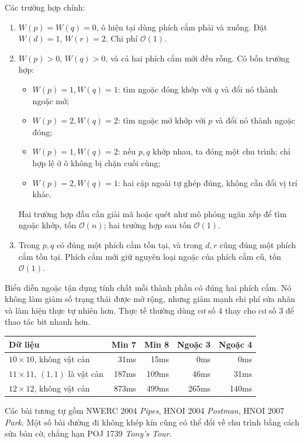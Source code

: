 \documentclass[11pt]{article}
\newcommand{\Oh}{\mathcal{O}}
\begin{document}
Các trường hợp chính:
\begin{enumerate}
  \item {} \(W(p)=W(q)=0\), ô hiện tại dùng phích cắm
  phải và xuống. Đặt \(W(d)=1\), \(W(r)=2\). Chi phí \(\Oh(1)\).
  \item {} \(W(p)>0\), \(W(q)>0\), và cả hai phích
  cắm mới đều rỗng. Có bốn trường hợp:
  \begin{itemize}
    \item \(W(p)=1,W(q)=1\): tìm ngoặc đóng khớp với \(q\) và đổi nó thành
    ngoặc mở;
    \item \(W(p)=2,W(q)=2\): tìm ngoặc mở khớp với \(p\) và đổi nó thành
    ngoặc đóng;
    \item \(W(p)=1,W(q)=2\): nếu \(p,q\) khớp nhau, ta đóng một chu trình; chỉ
    hợp lệ ở ô không bị chặn cuối cùng;
    \item \(W(p)=2,W(q)=1\): hai cặp ngoài tự ghép đúng, không cần đổi vị trí
    khác.
  \end{itemize}
  Hai trường hợp đầu cần giải mã hoặc quét như mô phỏng ngăn xếp để tìm ngoặc
  khớp, tốn \(\Oh(n)\); hai trường hợp sau tốn \(\Oh(1)\).
  \item {} Trong \(p,q\) có đúng một phích cắm tồn tại,
  và trong \(d,r\) cũng đúng một phích cắm tồn tại. Phích cắm mới giữ nguyên
  loại ngoặc của phích cắm cũ, tốn \(\Oh(1)\).
\end{enumerate}

Biểu diễn ngoặc tận dụng tính chất mỗi thành phần có đúng hai phích cắm. Nó
không làm giảm số trạng thái được mở rộng, nhưng giảm mạnh chi phí sửa nhãn và
làm hiện thực tự nhiên hơn. Thực tế thường dùng cơ số \(4\) thay cho cơ số
\(3\) để thao tác bit nhanh hơn.

\begin{center}
\small
\begin{tabular}{lrrrr}
\hline
Dữ liệu & Min 7 & Min 8 & Ngoặc 3 & Ngoặc 4 \\
\hline
\(10\times10\), không vật cản & 31ms & 15ms & 0ms & 0ms \\
\(11\times11\), \((1,1)\) là vật cản & 187ms & 109ms & 46ms & 31ms \\
\(12\times12\), không vật cản & 873ms & 499ms & 265ms & 140ms \\
\hline
\end{tabular}
\end{center}

Các bài tương tự gồm NWERC 2004 \textit{Pipes}, HNOI 2004 \textit{Postman},
HNOI 2007 \textit{Park}. Một số bài đường đi không khép kín cũng có thể đổi về
chu trình bằng cách sửa bàn cờ, chẳng hạn POJ 1739 \textit{Tony's Tour}.
\end{document}
